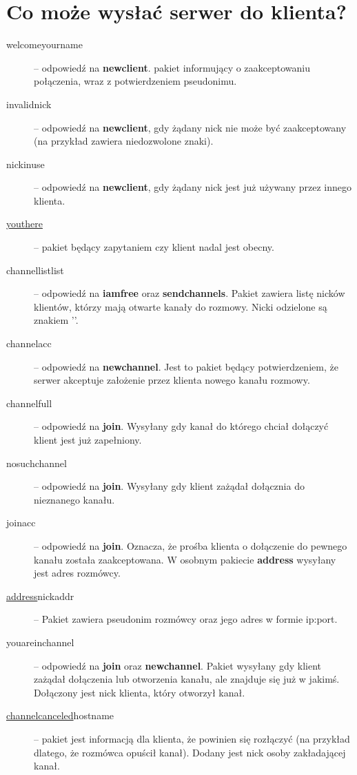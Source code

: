 \documentclass[a4paper, 10pt]{article}
\begin{document}
\section{Co może wysłać serwer do klienta?}
\begin{description}
 \item[ welcome\textbar yourname] -- odpowiedź na \textbf{newclient}. pakiet informujący o zaakceptowaniu połączenia, wraz z potwierdzeniem pseudonimu.
 \item[ invalidnick\textbar] -- odpowiedź na \textbf{newclient}, gdy żądany nick nie może być zaakceptowany (na przykład zawiera niedozwolone znaki).
 \item[ nickinuse\textbar] -- odpowiedź na \textbf{newclient}, gdy żądany nick jest już używany przez innego klienta.
 \item[ \underline{youthere}\textbar] -- pakiet będący zapytaniem czy klient nadal jest obecny.
 \item[ channellist\textbar list] -- odpowiedź na \textbf{iamfree} oraz \textbf{sendchannels}. Pakiet zawiera listę nicków klientów, którzy mają otwarte kanały do rozmowy. Nicki odzielone są znakiem '\textbar '.
 \item[ channelacc\textbar] -- odpowiedź na \textbf{newchannel}. Jest to pakiet będący potwierdzeniem, że serwer akceptuje założenie przez klienta nowego kanału rozmowy.
 \item[ channelfull\textbar] -- odpowiedź na \textbf{join}. Wysyłany gdy kanał do którego chciał dołączyć klient jest już zapełniony.
 \item[ nosuchchannel\textbar] -- odpowiedź na \textbf{join}. Wysyłany gdy klient zażądał dołącznia do nieznanego kanału.
 \item[ joinacc\textbar] -- odpowiedź na \textbf{join}. Oznacza, że prośba klienta o dołączenie do pewnego kanału została zaakceptowana. W osobnym pakiecie \textbf{address} wysyłany jest adres rozmówcy.
 \item[ \underline{address}\textbar nick\textbar addr] -- Pakiet zawiera pseudonim rozmówcy oraz jego adres w formie ip:port.
 \item[ youareinchannel] -- odpowiedź na \textbf{join} oraz \textbf{newchannel}. Pakiet wysyłany gdy klient zażądał dołączenia lub otworzenia kanału, ale znajduje się już w jakimś. Dołączony jest nick klienta, który otworzył kanał.
 \item[ \underline{channelcanceled}\textbar hostname] -- pakiet jest informacją dla klienta, że powinien się rozłączyć (na przykład dlatego, że rozmówca opuścił kanał). Dodany jest nick osoby zakładającej kanał. 

\end{description}
\end{document}
